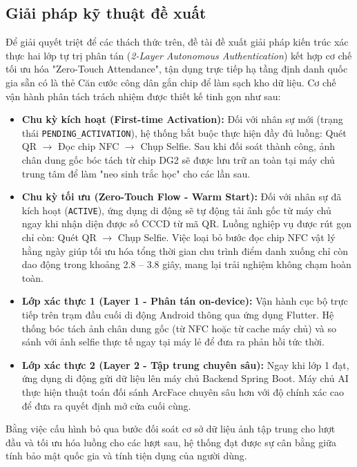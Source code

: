 \documentclass[../DoAn.tex]{subfiles}
\begin{document}
\subsection{Giải pháp kỹ thuật đề xuất}

Để giải quyết triệt để các thách thức trên, đề tài đề xuất giải pháp kiến trúc xác thực hai lớp tự trị phân tán (\textit{2-Layer Autonomous Authentication}) kết hợp cơ chế tối ưu hóa "Zero-Touch Attendance", tận dụng trực tiếp hạ tầng định danh quốc gia sẵn có là thẻ Căn cước công dân gắn chip để làm sạch kho dữ liệu. Cơ chế vận hành phân tách trách nhiệm được thiết kế tinh gọn như sau:
\begin{itemize}
    \item \textbf{Chu kỳ kích hoạt (First-time Activation):} Đối với nhân sự mới (trạng thái \texttt{PENDING\_ACTIVATION}), hệ thống bắt buộc thực hiện đầy đủ luồng: Quét QR $\rightarrow$ Đọc chip NFC $\rightarrow$ Chụp Selfie. Sau khi đối soát thành công, ảnh chân dung gốc bóc tách từ chip DG2 sẽ được lưu trữ an toàn tại máy chủ trung tâm để làm "neo sinh trắc học" cho các lần sau.
    \item \textbf{Chu kỳ tối ưu (Zero-Touch Flow - Warm Start):} Đối với nhân sự đã kích hoạt (\texttt{ACTIVE}), ứng dụng di động sẽ tự động tải ảnh gốc từ máy chủ ngay khi nhận diện được số CCCD từ mã QR. Luồng nghiệp vụ được rút gọn chỉ còn: Quét QR $\rightarrow$ Chụp Selfie. Việc loại bỏ bước đọc chip NFC vật lý hằng ngày giúp tối ưu hóa tổng thời gian chu trình điểm danh xuống chỉ còn dao động trong khoảng 2.8 -- 3.8 giây, mang lại trải nghiệm không chạm hoàn toàn.
    \item \textbf{Lớp xác thực 1 (Layer 1 - Phân tán on-device):} Vận hành cục bộ trực tiếp trên trạm đầu cuối di động Android thông qua ứng dụng Flutter. Hệ thống bóc tách ảnh chân dung gốc (từ NFC hoặc từ cache máy chủ) và so sánh với ảnh selfie thực tế ngay tại máy lẻ để đưa ra phản hồi tức thời.
    \item \textbf{Lớp xác thực 2 (Layer 2 - Tập trung chuyên sâu):} Ngay khi lớp 1 đạt, ứng dụng di động gửi dữ liệu lên máy chủ Backend Spring Boot. Máy chủ AI thực hiện thuật toán đối sánh ArcFace chuyên sâu hơn với độ chính xác cao để đưa ra quyết định mở cửa cuối cùng. 
\end{itemize}

Bằng việc cấu hình bỏ qua bước đối soát cơ sở dữ liệu ảnh tập trung cho lượt đầu và tối ưu hóa luồng cho các lượt sau, hệ thống đạt được sự cân bằng giữa tính bảo mật quốc gia và tính tiện dụng của người dùng.
\end{document}
